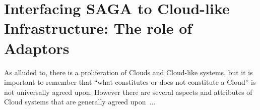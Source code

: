 \documentclass[conference,final]{IEEEtran}
\newcommand{\sagamapreduce }{SAGA-MapReduce }
\begin{document}



\section{Interfacing SAGA to Cloud-like Infrastructure: The role of
  Adaptors}

As alluded to, there is a proliferation of Clouds and Cloud-like
systems, but it is important to remember that ``what constitutes or
does not constitute a Cloud'' is not universally agreed upon.  However
there are several aspects and attributes of Cloud systems that are
generally agreed upon~\cite{buyya_hpcc}...
\end{document}
